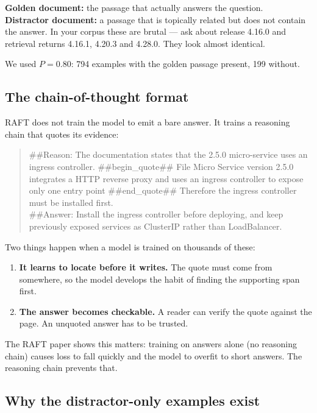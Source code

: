 \documentclass[11pt,a4paper]{article}
\begin{document}
\textbf{Golden document:} the passage that actually answers the question.\\
\textbf{Distractor document:} a passage that is topically related but does not
contain the answer. In your corpus these are brutal --- ask about release 4.16.0
and retrieval returns 4.16.1, 4.20.3 and 4.28.0. They look almost identical.

We used $P = 0.80$: 794 examples with the golden passage present, 199 without.

\subsection{The chain-of-thought format}

RAFT does not train the model to emit a bare answer. It trains a reasoning chain
that quotes its evidence:

\begin{quote}\ttfamily\small
\#\#Reason: The documentation states that the 2.5.0 micro-service uses an ingress
controller. \#\#begin\_quote\#\# File Micro Service version 2.5.0 integrates a
HTTP reverse proxy and uses an ingress controller to expose only one entry point
\#\#end\_quote\#\# Therefore the ingress controller must be installed first.\\
\#\#Answer: Install the ingress controller before deploying, and keep previously
exposed services as ClusterIP rather than LoadBalancer.
\end{quote}

Two things happen when a model is trained on thousands of these:

\begin{enumerate}[leftmargin=1.4em]
  \item \textbf{It learns to locate before it writes.} The quote must come from
        somewhere, so the model develops the habit of finding the supporting span
        first.
  \item \textbf{The answer becomes checkable.} A reader can verify the quote
        against the page. An unquoted answer has to be trusted.
\end{enumerate}

The RAFT paper shows this matters: training on answers alone (no reasoning chain)
causes loss to fall quickly and the model to overfit to short answers. The
reasoning chain prevents that.

\subsection{Why the distractor-only examples exist}
\end{document}
